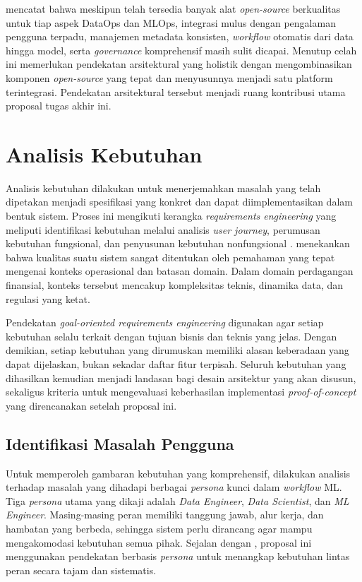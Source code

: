 \textcite{burgueno2025toward} mencatat bahwa meskipun telah tersedia banyak alat \textit{open-source} berkualitas untuk tiap aspek DataOps dan MLOps, integrasi mulus dengan pengalaman pengguna terpadu, manajemen metadata konsisten, \textit{workflow} otomatis dari data hingga model, serta \textit{governance} komprehensif masih sulit dicapai. Menutup celah ini memerlukan pendekatan arsitektural yang holistik dengan mengombinasikan komponen \textit{open-source} yang tepat dan menyusunnya menjadi satu platform terintegrasi. Pendekatan arsitektural tersebut menjadi ruang kontribusi utama proposal tugas akhir ini.

\section{Analisis Kebutuhan}

Analisis kebutuhan dilakukan untuk menerjemahkan masalah yang telah dipetakan menjadi spesifikasi yang konkret dan dapat diimplementasikan dalam bentuk sistem. Proses ini mengikuti kerangka \textit{requirements engineering} yang meliputi identifikasi kebutuhan melalui analisis \textit{user journey}, perumusan kebutuhan fungsional, dan penyusunan kebutuhan nonfungsional \autocite{sommerville2016software}. \textcite{nuseibeh2000requirements} menekankan bahwa kualitas suatu sistem sangat ditentukan oleh pemahaman yang tepat mengenai konteks operasional dan batasan domain. Dalam domain perdagangan finansial, konteks tersebut mencakup kompleksitas teknis, dinamika data, dan regulasi yang ketat.

Pendekatan \textit{goal-oriented requirements engineering} \autocite{lamsweerde2009requirements} digunakan agar setiap kebutuhan selalu terkait dengan tujuan bisnis dan teknis yang jelas. Dengan demikian, setiap kebutuhan yang dirumuskan memiliki alasan keberadaan yang dapat dijelaskan, bukan sekadar daftar fitur terpisah. Seluruh kebutuhan yang dihasilkan kemudian menjadi landasan bagi desain arsitektur yang akan disusun, sekaligus kriteria untuk mengevaluasi keberhasilan implementasi \textit{proof-of-concept} yang direncanakan setelah proposal ini.

\subsection{Identifikasi Masalah Pengguna}

Untuk memperoleh gambaran kebutuhan yang komprehensif, dilakukan analisis terhadap masalah yang dihadapi berbagai \textit{persona} kunci dalam \textit{workflow} ML. Tiga \textit{persona} utama yang dikaji adalah \textit{Data Engineer}, \textit{Data Scientist}, dan \textit{ML Engineer}. Masing-masing peran memiliki tanggung jawab, alur kerja, dan hambatan yang berbeda, sehingga sistem perlu dirancang agar mampu mengakomodasi kebutuhan semua pihak. Sejalan dengan \textcite{amershi2019software}, proposal ini menggunakan pendekatan berbasis \textit{persona} untuk menangkap kebutuhan lintas peran secara tajam dan sistematis.

